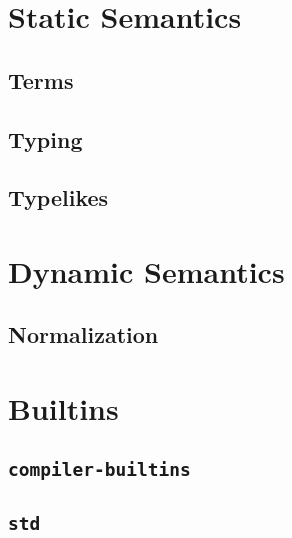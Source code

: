 \documentclass{article}
\begin{document}
\section{Static Semantics}
	\subsection{Terms}
	\subsection{Typing}
	\subsection{Typelikes}
	\clearpage

\section{Dynamic Semantics}
	\subsection{Normalization}

\section{Builtins}
	\subsection{\texttt{compiler-builtins}}
	\subsection{\texttt{std}}
\end{document}
